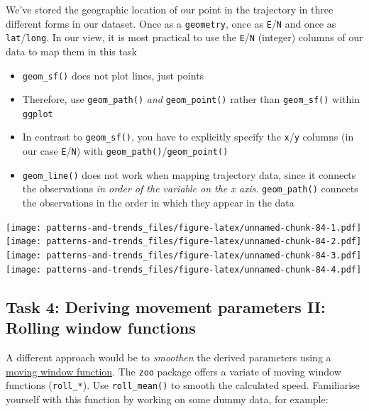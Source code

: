 \documentclass[]{book}
\providecommand{\tightlist}{%
  \setlength{\itemsep}{0pt}\setlength{\parskip}{0pt}}
\begin{document}
We've stored the geographic location of our point in the trajectory in
three different forms in our dataset. Once as a \texttt{geometry}, once
as \texttt{E}/\texttt{N} and once as \texttt{lat}/\texttt{long}. In our
view, it is most practical to use the \texttt{E}/\texttt{N} (integer)
columns of our data to map them in this task

\begin{itemize}
\tightlist
\item
  \texttt{geom\_sf()} does not plot lines, just points
\item
  Therefore, use \texttt{geom\_path()} \emph{and} \texttt{geom\_point()}
  rather than \texttt{geom\_sf()} within \texttt{ggplot}
\item
  In contrast to \texttt{geom\_sf()}, you have to explicitly specify the
  \texttt{x}/\texttt{y} columns (in our case \texttt{E}/\texttt{N}) with
  \texttt{geom\_path()}/\texttt{geom\_point()}
\item
  \texttt{geom\_line()} does not work when mapping trajectory data,
  since it connects the observations \emph{in order of the variable on
  the x axis}. \texttt{geom\_path()} connects the observations in the
  order in which they appear in the data
\end{itemize}

\texttt{[image: patterns-and-trends\_files/figure-latex/unnamed-chunk-84-1.pdf]}
\texttt{[image: patterns-and-trends\_files/figure-latex/unnamed-chunk-84-2.pdf]}
\texttt{[image: patterns-and-trends\_files/figure-latex/unnamed-chunk-84-3.pdf]}
\texttt{[image: patterns-and-trends\_files/figure-latex/unnamed-chunk-84-4.pdf]}

\subsection{Task 4: Deriving movement parameters II: Rolling window
functions}\label{task-4-deriving-movement-parameters-ii-rolling-window-functions}

A different approach would be to \emph{smoothen} the derived parameters
using a
\href{https://docs.wavefront.com/images/5sec_moving_window.png}{moving
window function}. The \texttt{zoo} package offers a variate of moving
window functions (\texttt{roll\_*}). Use \texttt{roll\_mean()} to smooth
the calculated speed. Familiarise yourself with this function by working
on some dummy data, for example:
\end{document}
